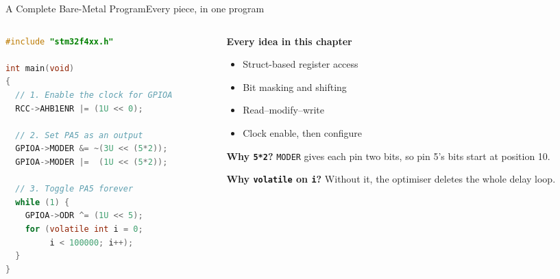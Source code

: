 \documentclass[9pt,aspectratio=169,xcolor=table]{beamer}
\begin{document}
\begin{frame}[fragile]{A Complete Bare-Metal Program}{Every piece, in one program}
    \begin{columns}[c]
    \begin{column}{.56\textwidth}
\begin{lstlisting}[language=C, basicstyle=\ttfamily\small]
#include "stm32f4xx.h"

int main(void)
{
  // 1. Enable the clock for GPIOA
  RCC->AHB1ENR |= (1U << 0);

  // 2. Set PA5 as an output
  GPIOA->MODER &= ~(3U << (5*2));
  GPIOA->MODER |=  (1U << (5*2));

  // 3. Toggle PA5 forever
  while (1) {
    GPIOA->ODR ^= (1U << 5);
    for (volatile int i = 0;
         i < 100000; i++);
  }
}
\end{lstlisting}
    \end{column}
    \begin{column}{.4\textwidth}
        \textbf{Every idea in this chapter}
        {\small
        \begin{itemize}\itemsep1pt
            \item Struct-based register access
            \item Bit masking and shifting
            \item Read--modify--write
            \item Clock enable, then configure
        \end{itemize}}

        \vspace{2mm}
        {\small \textbf{Why \texttt{5*2}?} \texttt{MODER} gives each
        pin \alert{two} bits, so pin 5's bits start at position 10.}

        \vspace{2mm}
        {\small \textbf{Why \texttt{volatile} on \texttt{i}?} Without
        it, the optimiser deletes the whole delay loop.}
    \end{column}
    \end{columns}
\end{frame}
\end{document}

